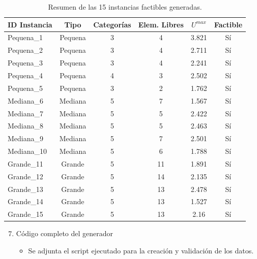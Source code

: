 \begin{table}[htbp]
\centering
\begin{tabular}{|l|c|c|c|c|c|}
\hline
\textbf{ID Instancia} & \textbf{Tipo} & \textbf{Categorías} & \textbf{Elem. Libres} & \textbf{$U^{max}$} & \textbf{Factible} \\ \hline

Pequena\_1 & Pequena & 3 & 4 & 3.821 & Sí \\ \hline
Pequena\_2 & Pequena & 3 & 4 & 2.711 & Sí \\ \hline
Pequena\_3 & Pequena & 3 & 4 & 2.241 & Sí \\ \hline
Pequena\_4 & Pequena & 4 & 3 & 2.502 & Sí \\ \hline
Pequena\_5 & Pequena & 3 & 2 & 1.762 & Sí \\ \hline
Mediana\_6 & Mediana & 5 & 7 & 1.567 & Sí \\ \hline
Mediana\_7 & Mediana & 5 & 5 & 2.422 & Sí \\ \hline
Mediana\_8 & Mediana & 5 & 5 & 2.463 & Sí \\ \hline
Mediana\_9 & Mediana & 5 & 7 & 2.501 & Sí \\ \hline
Mediana\_10 & Mediana & 5 & 6 & 1.788 & Sí \\ \hline
Grande\_11 & Grande & 5 & 11 & 1.891 & Sí \\ \hline
Grande\_12 & Grande & 5 & 14 & 2.135 & Sí \\ \hline
Grande\_13 & Grande & 5 & 13 & 2.478 & Sí \\ \hline
Grande\_14 & Grande & 5 & 13 & 1.527 & Sí \\ \hline
Grande\_15 & Grande & 5 & 13 & 2.16 & Sí \\ \hline

\end{tabular}
\caption{Resumen de las 15 instancias factibles generadas.}
\label{tab:resumen_instancias}
\end{table}

\newpage

\begin{enumerate}
\setcounter{enumi}{6}
\item Código completo del generador
\begin{itemize}
\item Se adjunta el script ejecutado para la creación y validación de los datos.
\end{itemize}
\end{enumerate}


